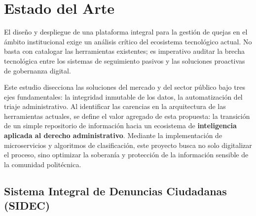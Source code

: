 \chapter{Estado del Arte}

\begin{flushleft}
\justifying
El diseño y despliegue de una plataforma integral para la gestión de quejas en el ámbito institucional exige un análisis crítico del ecosistema tecnológico actual. No basta con catalogar las herramientas existentes; es imperativo auditar la brecha tecnológica entre los sistemas de seguimiento pasivos y las soluciones proactivas de gobernanza digital. 

Este estudio disecciona las soluciones del mercado y del sector público bajo tres ejes fundamentales: la integridad inmutable de los datos, la automatización del triaje administrativo. Al identificar las carencias en la arquitectura de las herramientas actuales, se define el valor agregado de esta propuesta: la transición de un simple repositorio de información hacia un ecosistema de \textbf{inteligencia aplicada al derecho administrativo}. Mediante la implementación de microservicios y algoritmos de clasificación, este proyecto busca no solo digitalizar el proceso, sino optimizar la soberanía y protección de la información sensible de la comunidad politécnica.
\end{flushleft}

\section{Sistema Integral de Denuncias Ciudadanas (SIDEC)}

